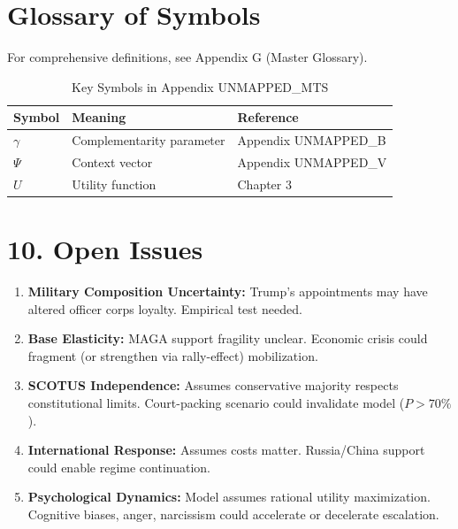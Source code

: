 \section{Glossary of Symbols}
\label{sec:mts-glossary}

For comprehensive definitions, see Appendix G (Master Glossary).

\begin{table}[htbp]
\centering
\caption{Key Symbols in Appendix UNMAPPED_MTS}
\begin{tabular}{lll}
\toprule
\textbf{Symbol} & \textbf{Meaning} & \textbf{Reference} \\
\midrule
$\gamma$ & Complementarity parameter & Appendix UNMAPPED_B \\
$\Psi$ & Context vector & Appendix UNMAPPED_V \\
$U$ & Utility function & Chapter 3 \\
\bottomrule
\end{tabular}
\end{table}


\section{10. Open Issues}

\begin{enumerate}
\item \textbf{Military Composition Uncertainty:} Trump's appointments may have altered officer corps loyalty. Empirical test needed.

\item \textbf{Base Elasticity:} MAGA support fragility unclear. Economic crisis could fragment (or strengthen via rally-effect) mobilization.

\item \textbf{SCOTUS Independence:} Assumes conservative majority respects constitutional limits. Court-packing scenario could invalidate model ($P > 70\%$).

\item \textbf{International Response:} Assumes costs matter. Russia/China support could enable regime continuation.

\item \textbf{Psychological Dynamics:} Model assumes rational utility maximization. Cognitive biases, anger, narcissism could accelerate or decelerate escalation.
\end{enumerate}

